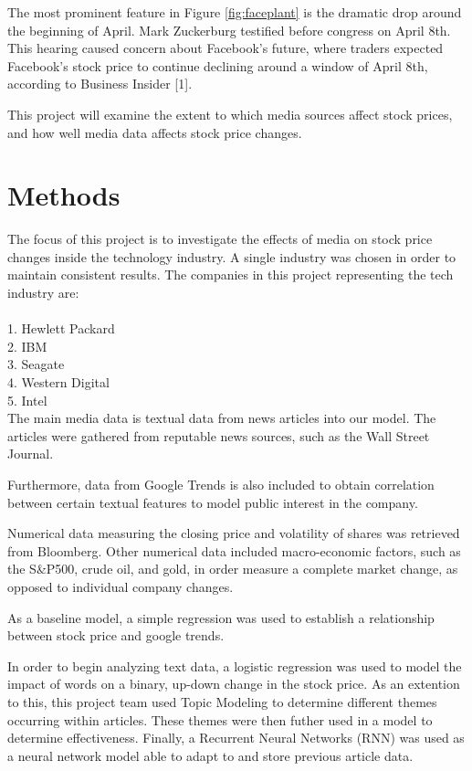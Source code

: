 \documentclass{article}
\begin{document}
The most prominent feature in Figure \ref{fig:faceplant} is the dramatic drop around the beginning of April. Mark Zuckerburg testified before congress on April 8th. This hearing caused concern about Facebook's future, where traders expected Facebook's stock price to continue declining around a window of April 8th, according to Business Insider [1].

This project will examine the extent to which media sources affect stock prices, and how well media data affects stock price changes.

\newpage 

\section{Methods}

The focus of this project is to investigate the effects of media on stock price changes inside the technology industry. A single industry was chosen in order to maintain consistent results. The companies in this project representing the tech industry are: \\
\\
1. Hewlett Packard \\
2. IBM \\
3. Seagate \\
4. Western Digital \\
5. Intel \\

The main media data is textual data from news articles into our model. The articles were gathered from reputable news sources, such as the Wall Street Journal. 

Furthermore, data from Google Trends is also included to obtain correlation between certain textual features to model public interest in the company.  

Numerical data measuring the closing price and volatility of shares was retrieved from Bloomberg. Other numerical data included macro-economic factors, such as the S\&P500, crude oil, and gold, in order measure a complete market change, as opposed to individual company changes. 

As a baseline model, a simple regression was used to establish a relationship between stock price and google trends. 

In order to begin analyzing text data, a logistic regression was used to model the impact of words on a binary, up-down change in the stock price. As an extention to this, this project team used Topic Modeling to determine different themes occurring within articles. These themes were then futher used in a model to determine effectiveness. Finally, a Recurrent Neural Networks (RNN) was used as a neural network model able to adapt to and store previous article data. 
\end{document}
